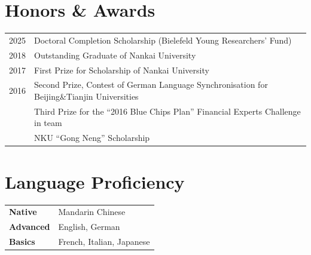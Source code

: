 \documentclass[a4paper,12pt]{article}
\begin{document}
\section{Honors \& Awards}
\begin{tabularx}{\linewidth}{@{}l X@{}}
2025 & \hfill Doctoral Completion Scholarship (Bielefeld Young Researchers’ Fund) \\

2018 & \hfill Outstanding Graduate of Nankai University \\

2017 & \hfill First Prize for Scholarship of Nankai University \\

2016 & \hfill Second Prize, Contest of German Language Synchronisation for Beijing\&Tianjin Universities \\

& \hfill Third Prize for the “2016 Blue Chips Plan” Financial Experts Challenge in team \\

& \hfill NKU “Gong Neng” Scholarship \\

\end{tabularx}





\section{Language Proficiency}
\begin{tabularx}{\linewidth}{@{}l X@{}}
\textbf{Native} & \hfill  \normalsize{Mandarin Chinese}\\
\textbf{Advanced}  &  \hfill \normalsize{English, German}\\ 
\textbf{Basics}  & \hfill \normalsize{French, Italian, Japanese}\\ 
\end{tabularx}
\end{document}
